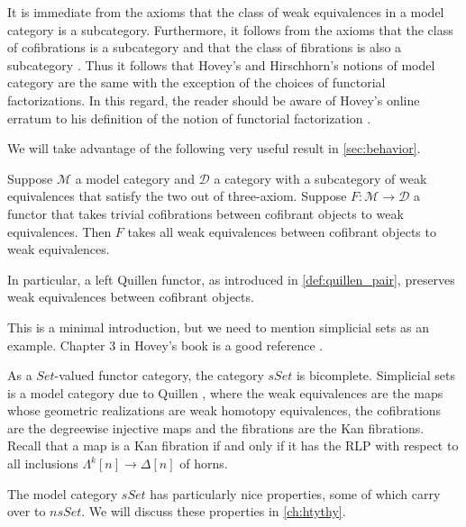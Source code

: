 It is immediate from the axioms that the class of weak equivalences in a model category is a subcategory. Furthermore, it follows from the axioms that the class of cofibrations is a subcategory and that the class of fibrations is also a subcategory \cite[Prop.~7.2.4, p.~111]{Hi03}. Thus it follows that Hovey's \cite[Def.~1.1.4, p.~3]{Ho99} and Hirschhorn's \cite[Def.~7.1.3, p.109]{Hi03} notions of model category are the same with the exception of the choices of functorial factorizations. In this regard, the reader should be aware of Hovey's online erratum to his definition of the notion of functorial factorization \cite[Def.~1.1.1, p.~2]{Ho99}.

We will take advantage of the following very useful result in \cref{sec:behavior}.
\begin{lemma}
Suppose $\mathscr{M}$ a model category and $\mathscr{D}$ a category with a subcategory of weak equivalences that satisfy the two out of three-axiom. Suppose $F:\mathscr{M} \to \mathscr{D}$ a functor that takes trivial cofibrations between cofibrant objects to weak equivalences. Then $F$ takes all weak equivalences between cofibrant objects to weak equivalences.
\end{lemma}
\noindent In particular, a left Quillen functor, as introduced in \cref{def:quillen_pair}, preserves weak equivalences between cofibrant objects.

This is a minimal introduction, but we need to mention simplicial sets as an example. Chapter 3 in Hovey's book is a good reference \cite[pp.~73-100]{Ho99}.
\begin{example}\label{ex:simplicial_sets_standard_model_str}
As a $Set$-valued functor category, the category $sSet$ is bicomplete. Simplicial sets is a model category due to Quillen \cite{Qu67}, where the weak equivalences are the maps whose geometric realizations are weak homotopy equivalences, the cofibrations are the degreewise injective maps and the fibrations are the Kan fibrations. Recall that a map is a Kan fibration if and only if it has the RLP with respect to all inclusions $\Lambda ^k[n]\to \Delta [n]$ of horns.
\end{example}
\noindent The model category $sSet$ has particularly nice properties, some of which carry over to $nsSet$. We will discuss these properties in \cref{ch:htythy}.

